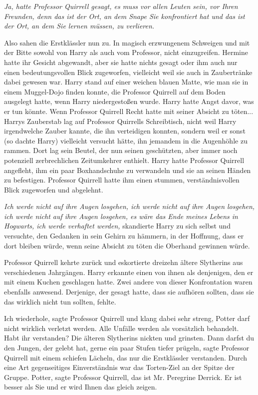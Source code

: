 \emph{Ja, hatte Professor Quirrell gesagt, es muss vor allen Leuten sein, vor
Ihren Freunden, denn das ist der Ort, an dem Snape Sie konfrontiert hat und das
ist der Ort, an dem Sie lernen müssen, zu verlieren.}

Also sahen die Erstklässler nun zu. In magisch erzwungenem Schweigen und mit der
Bitte sowohl von Harry als auch vom Professor, nicht einzugreifen. Hermine hatte
ihr Gesicht abgewandt, aber sie hatte nichts gesagt oder ihm auch nur einen
bedeutungsvollen Blick zugeworfen, vielleicht weil sie auch in Zaubertränke
dabei gewesen war. Harry stand auf einer weichen blauen Matte, wie man sie in
einem Muggel-Dojo finden konnte, die Professor Quirrell auf dem Boden ausgelegt
hatte, wenn Harry niedergestoßen wurde. Harry hatte Angst davor, was er tun
könnte. Wenn Professor Quirrell Recht hatte mit seiner Absicht zu töten...
Harrys Zauberstab lag auf Professor Quirrells Schreibtisch, nicht weil Harry
irgendwelche Zauber kannte, die ihn verteidigen konnten, sondern weil er sonst
(so dachte Harry) vielleicht versucht hätte, ihn jemandem in die Augenhöhle zu
rammen. Dort lag sein Beutel, der nun seinen geschützten, aber immer noch
potenziell zerbrechlichen Zeitumkehrer enthielt. Harry hatte Professor Quirrell
angefleht, ihm ein paar Boxhandschuhe zu verwandeln und sie an seinen Händen zu
befestigen. Professor Quirrell hatte ihm einen stummen, verständnisvollen Blick
zugeworfen und abgelehnt.

\emph{Ich werde nicht auf ihre Augen losgehen, ich werde nicht auf ihre Augen
losgehen, ich werde nicht auf ihre Augen losgehen, es wäre das Ende meines
Lebens in Hogwarts, ich werde verhaftet werden,} skandierte Harry zu sich selbst
und versuchte, den Gedanken in sein Gehirn zu hämmern, in der Hoffnung, dass er
dort bleiben würde, wenn seine Absicht zu töten die Oberhand gewinnen würde.

Professor Quirrell kehrte zurück und eskortierte dreizehn ältere Slytherins aus
verschiedenen Jahrgängen. Harry erkannte einen von ihnen als denjenigen, den er
mit einem Kuchen geschlagen hatte. Zwei andere von dieser Konfrontation waren
ebenfalls anwesend. Derjenige, der gesagt hatte, dass sie aufhören sollten, dass
sie das wirklich nicht tun sollten, fehlte.

\glqq{}Ich wiederhole\grqq{}, sagte Professor Quirrell und klang dabei sehr
streng, \glqq{}Potter darf nicht wirklich verletzt werden. Alle Unfälle werden
als vorsätzlich behandelt. Habt ihr verstanden?\grqq{} Die älteren Slytherins
nickten und grinsten. \glqq{}Dann darfst du den Jungen, der gelebt hat, gerne ein
paar Stufen tiefer prügeln\grqq{}, sagte Professor Quirrell mit einem schiefen
Lächeln, das nur die Erstklässler verstanden. Durch eine Art gegenseitiges
Einverständnis war das Torten-Ziel an der Spitze der Gruppe. \glqq
Potter\grqq{}, sagte Professor Quirrell, \glqq{}das ist Mr. Peregrine Derrick. Er
ist besser als Sie und er wird Ihnen das gleich zeigen.\grqq{}

